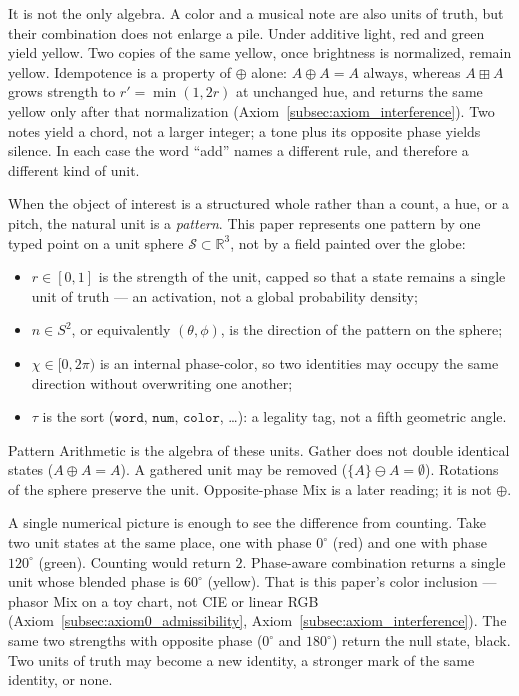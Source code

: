 \documentclass[12pt, a4paper]{article}
\begin{document}
It is not the only algebra. A color and a musical note are also
units of truth, but their combination does not enlarge a pile.
Under additive light, red and green yield yellow. Two copies of
the same yellow, once brightness is normalized, remain yellow.
Idempotence is a property of $\oplus$ alone: $A\oplus A=A$ always,
whereas $A\boxplus A$ grows strength to $r'=\min(1,2r)$ at unchanged
hue, and returns the same yellow only after that normalization
(Axiom~\ref{subsec:axiom_interference}).
Two notes yield a chord, not a larger integer; a tone plus its
opposite phase yields silence. In each case the word ``add''
names a different rule, and therefore a different kind of unit.

When the object of interest is a structured whole rather than a
count, a hue, or a pitch, the natural unit is a \emph{pattern}.
This paper represents one pattern by one typed point on a unit
sphere $\mathcal{S} \subset \mathbb{R}^3$, not by a field painted over the globe:
\begin{itemize}
    \item $r \in [0, 1]$ is the strength of the unit, capped so that a state remains a single unit of truth --- an activation, not a global probability density;
    \item $\hat n \in S^2$, or equivalently $(\theta, \phi)$, is the direction of the pattern on the sphere;
    \item $\chi \in [0, 2\pi)$ is an internal phase-color, so two identities may occupy the same direction without overwriting one another;
    \item $\tau$ is the sort ($\mathtt{word}$, $\mathtt{num}$, $\mathtt{color}$, \ldots): a legality tag, not a fifth geometric angle.
\end{itemize}
Pattern Arithmetic is the algebra of these units. Gather does not double identical states ($A \oplus A = A$). A gathered unit may be removed ($\{A\} \ominus A = \emptyset$). Rotations of the sphere preserve the unit. Opposite-phase Mix is a later reading; it is not $\oplus$.

A single numerical picture is enough to see the difference from counting. Take two unit states at the same place, one with phase $0^\circ$ (red) and one with phase $120^\circ$ (green). Counting would return $2$. Phase-aware combination returns a single unit whose blended phase is $60^\circ$ (yellow). That is this paper's color inclusion --- phasor Mix on a toy chart, not CIE or linear RGB (Axiom~\ref{subsec:axiom0_admissibility}, Axiom~\ref{subsec:axiom_interference}). The same two strengths with opposite phase ($0^\circ$ and $180^\circ$) return the null state, black. Two units of truth may become a new identity, a stronger mark of the same identity, or none.
\end{document}
